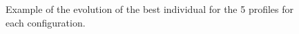 \documentclass[runningheads]{llncs}
\begin{document}
\begin{figure}[htb]
\centering

\caption{Example of the evolution of the best individual for the 5 profiles for each configuration.}

\label{fig:boxplots}
\end{figure}
\end{document}
